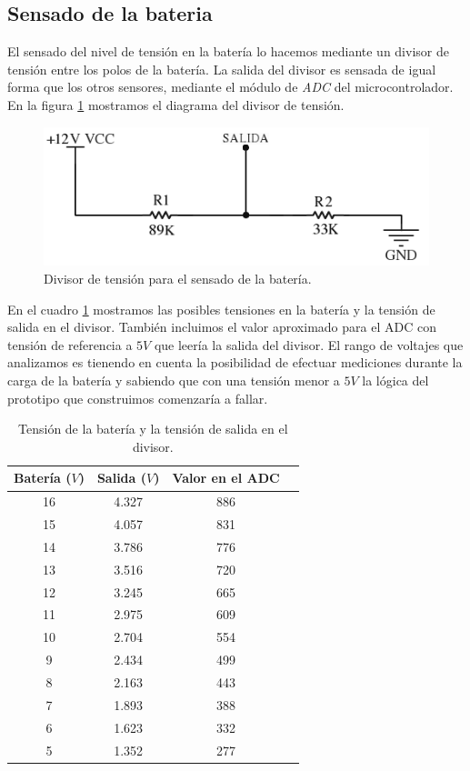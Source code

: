 \subsection{Sensado de la bateria}
\label{h_sensado_bateria}

El sensado del nivel de tensi\'on en la bater\'ia lo hacemos mediante un divisor de tensi\'on entre los polos de la bater\'ia.
La salida del divisor es sensada de igual forma que los otros sensores, mediante el m\'odulo de \emph{ADC} del microcontrolador.
En la figura \ref{hF_bateria_diagrama} mostramos el diagrama del divisor de tensi\'on.

\begin{figure}[ht]
	\centering
	\includegraphics[scale=0.35]{bateria.png}
	\caption{Divisor de tensi\'on para el sensado de la bater\'ia.}
	\label{hF_bateria_diagrama}
\end{figure}

En el cuadro \ref{hT_bateria_divT} mostramos las posibles tensiones en la bater\'ia y la tensi\'on de salida en el divisor.
Tambi\'en incluimos el valor aproximado para el ADC con tensi\'on de referencia a $5V$ que leer\'ia la salida del divisor.
El rango de voltajes que analizamos es tienendo en cuenta la posibilidad de efectuar mediciones durante la carga de la bater\'ia
y sabiendo que con una tensi\'on menor a $5 V$ la l\'ogica del prototipo que construimos comenzar\'ia a fallar.

\begin{table}[ht]
	\begin{center}
		\begin{tabular}{|c|c|c|c|}
			\hline
			Bater\'ia ($V$) & Salida ($V$) & Valor en el ADC \\
			\hline
			16 & 4.327 & 886 \\
			15 & 4.057 & 831 \\
			14 & 3.786 & 776 \\
			13 & 3.516 & 720 \\
			12 & 3.245 & 665 \\
			11 & 2.975 & 609 \\
			10 & 2.704 & 554 \\
			 9 & 2.434 & 499 \\
			 8 & 2.163 & 443 \\
			 7 & 1.893 & 388 \\
			 6 & 1.623 & 332 \\
			 5 & 1.352 & 277 \\
			\hline
		\end{tabular}
	\end{center}
	\caption{Tensi\'on de la bater\'ia y la tensi\'on de salida en el divisor.}
	\label{hT_bateria_divT}
\end{table}

